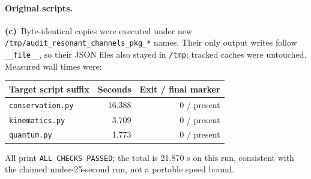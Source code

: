 \documentclass[11pt,a4paper]{article}
\newcommand{\Lc}{\textbf{(c)}\ }
\begin{document}
\paragraph{Original scripts.}
\Lc Byte-identical copies were executed under new
\texttt{/tmp/audit\_\allowbreak resonant\_\allowbreak channels\_\allowbreak pkg\_*} names. Their only output
writes follow \texttt{\_\_file\_\_}, so their JSON files also stayed in
\texttt{/tmp}; tracked caches were untouched. Measured wall times were:
\begin{center}
\begin{tabular}{lrr}\toprule
Target script suffix & Seconds & Exit / final marker\\\midrule
\texttt{conservation.py} & 16.388 & 0 / present\\
\texttt{kinematics.py} & 3.709 & 0 / present\\
\texttt{quantum.py} & 1.773 & 0 / present\\\bottomrule
\end{tabular}
\end{center}
All print \texttt{ALL CHECKS PASSED}; the total is 21.870 s on this run,
consistent with the claimed under-25-second run, not a portable speed bound.
\end{document}
